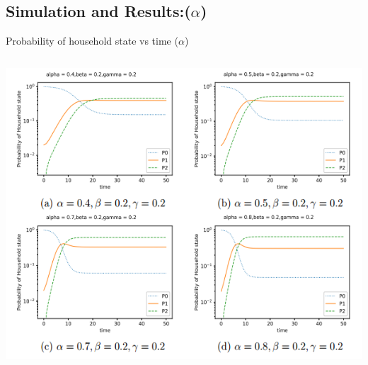 \documentclass[smaller,aspectratio=169, toc=bibliography]{beamer}
\begin{document}
\subsection*{Simulation and Results:($\alpha$) }
\begin{frame}{Probability of household state vs time ($\alpha$)}

\begin{columns}[c]
        \begin{center}
        \includegraphics[scale=0.3]{screenshot/7alphaP_kvstime.png}
        \end{center}
		
\end{columns}
\end{frame}
\end{document}
